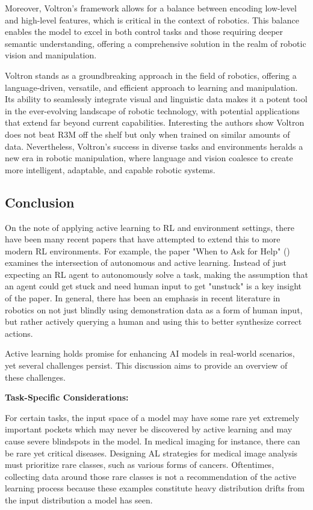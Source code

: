 \documentclass[
  letterpaper,
  numbers=noenddot,
  DIV=11]{scrreprt}
\theoremstyle{definition}
\theoremstyle{plain}
\theoremstyle{plain}
\theoremstyle{remark}
\begin{document}
Moreover, Voltron's framework allows for a balance between encoding
low-level and high-level features, which is critical in the context of
robotics. This balance enables the model to excel in both control tasks
and those requiring deeper semantic understanding, offering a
comprehensive solution in the realm of robotic vision and manipulation.

Voltron stands as a groundbreaking approach in the field of robotics,
offering a language-driven, versatile, and efficient approach to
learning and manipulation. Its ability to seamlessly integrate visual
and linguistic data makes it a potent tool in the ever-evolving
landscape of robotic technology, with potential applications that extend
far beyond current capabilities. Interesting the authors show Voltron
does not beat R3M off the shelf but only when trained on similar amounts
of data. Nevertheless, Voltron's success in diverse tasks and
environments heralds a new era in robotic manipulation, where language
and vision coalesce to create more intelligent, adaptable, and capable
robotic systems.

\subsection{Conclusion}\label{conclusion}

On the note of applying active learning to RL and environment settings,
there have been many recent papers that have attempted to extend this to
more modern RL environments. For example, the paper "When to Ask for
Help" () examines the
intersection of autonomous and active learning. Instead of just
expecting an RL agent to autonomously solve a task, making the
assumption that an agent could get stuck and need human input to get
"unstuck" is a key insight of the paper. In general, there has been an
emphasis in recent literature in robotics on not just blindly using
demonstration data as a form of human input, but rather actively
querying a human and using this to better synthesize correct actions.

Active learning holds promise for enhancing AI models in real-world
scenarios, yet several challenges persist. This discussion aims to
provide an overview of these challenges.

\textbf{Task-Specific Considerations:}

For certain tasks, the input space of a model may have some rare yet
extremely important pockets which may never be discovered by active
learning and may cause severe blindspots in the model. In medical
imaging for instance, there can be rare yet critical diseases. Designing
AL strategies for medical image analysis must prioritize rare classes,
such as various forms of cancers. Oftentimes, collecting data around
those rare classes is not a recommendation of the active learning
process because these examples constitute heavy distribution drifts from
the input distribution a model has seen.
\end{document}
